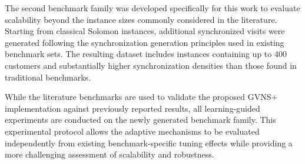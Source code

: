 The second benchmark family was developed specifically for this work to evaluate scalability beyond the instance sizes commonly considered in the literature. Starting from classical Solomon instances, additional synchronized visits were generated following the synchronization generation principles used in existing benchmark sets. The resulting dataset includes instances containing up to 400 customers and substantially higher synchronization densities than those found in traditional benchmarks.

While the literature benchmarks are used to validate the proposed GVNS+ implementation against previously reported results, all learning-guided experiments are conducted on the newly generated benchmark family. This experimental protocol allows the adaptive mechanisms to be evaluated independently from existing benchmark-specific tuning effects while providing a more challenging assessment of scalability and robustness.

